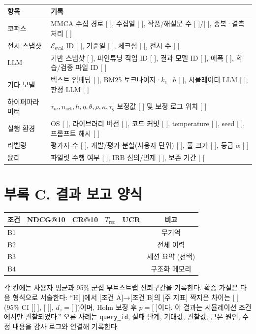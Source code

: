 \documentclass[10pt,twocolumn,letterpaper]{article}
\newcommand{\fillin}[1]{\textcolor{fillc}{[#1]}}
\newcommand{\cE}{\mathcal{E}}
\begin{document}
\begin{center}\small
\setlength{\tabcolsep}{5pt}
\renewcommand{\arraystretch}{1.15}
\begin{tabularx}{\textwidth}{@{}l>{\raggedright\arraybackslash}X@{}}
\toprule
항목 & 기록 \\
\midrule
코퍼스 & MMCA 수집 경로 \fillin{ }, 수집일 \fillin{ }, 작품/해설문 수 \fillin{ }/\fillin{ }, 중복·결측 처리 \fillin{ } \\
전시 스냅샷 & $\cE_{\mathrm{eval}}$ ID \fillin{ }, 기준일 \fillin{ }, 체크섬 \fillin{ }, 전시 수 \fillin{ } \\
LLM & 기반 스냅샷 \fillin{ }, 파인튜닝 작업 ID \fillin{ }, 결과 모델 ID \fillin{ }, 에폭 \fillin{ }, 학습/검증 파일 ID \fillin{ } \\
기타 모델 & 텍스트 임베딩 \fillin{ }, BM25 토크나이저·$k_1$·$b$ \fillin{ }, 시뮬레이터 LLM \fillin{ }, 판정 LLM \fillin{ } \\
하이퍼파라미터 & $\tau_m,n_{\mathrm{act}},h,\eta,\theta,\rho,\kappa,\tau_g$ 보정값 \fillin{ } 및 보정 로그 위치 \fillin{ } \\
실행 환경 & OS \fillin{ }, 라이브러리 버전 \fillin{ }, 코드 커밋 \fillin{ }, temperature \fillin{ }, seed \fillin{ }, 프롬프트 해시 \fillin{ } \\
라벨링 & 평가자 수 \fillin{ }, 개발/평가 분할(사용자 단위) \fillin{ }, 풀 크기 \fillin{ }, 등급 $\alpha$ \fillin{ } \\
윤리 & 파일럿 수행 여부 \fillin{ }, IRB 심의/면제 \fillin{ }, 보존 기간 \fillin{ } \\
\bottomrule
\end{tabularx}
\end{center}

\section*{부록 C. 결과 보고 양식}
\begin{center}\small
\setlength{\tabcolsep}{8pt}
\renewcommand{\arraystretch}{1.15}
\begin{tabular}{@{}lccccc@{}}
\toprule
조건 & NDCG@10 & CR@10 & $T_{\mathrm{rec}}$ & UCR & 비고 \\
\midrule
B1 & & & & & 무기억 \\
B2 & & & & & 전체 이력 \\
B3 & & & & & 세션 요약 (선택) \\
B4 & & & & & 구조화 메모리 \\
\bottomrule
\end{tabular}
\end{center}
각 칸에는 사용자 평균과 95\% 군집 부트스트랩 신뢰구간을 기록한다. 확증 가설은 다음 형식으로 서술한다: ``H\fillin{ }에서 \fillin{조건 A}→\fillin{조건 B}의 \fillin{주 지표} 짝지은 차이는 \fillin{ } (95\% CI [\fillin{ }, \fillin{ }], $d_z=$\fillin{ })이며, Holm 보정 후 $p=$\fillin{ }이다. 이 결과는 시뮬레이션 조건에서만 관찰되었다.'' 오류 사례는 \texttt{query\_id}, 실패 단계, 기대값, 관찰값, 근본 원인, 수정 내용을 감사 로그와 연결해 기록한다.
\end{document}
